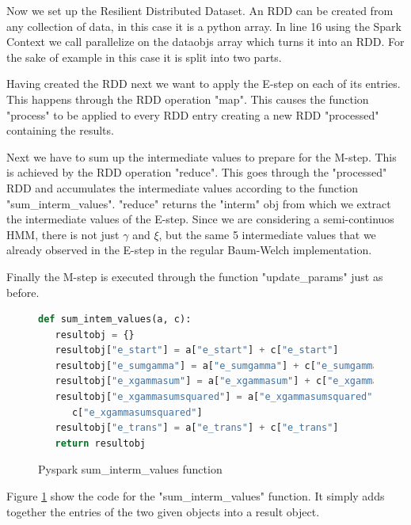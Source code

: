 Now we set up the Resilient Distributed Dataset. An RDD can be created from any collection of data, in this case it is a python array. In line 16 using the Spark Context we call parallelize on the dataobjs array which turns it into an RDD. For the sake of example in this case it is split into two parts. 

Having created the RDD next we want to apply the E-step on each of its entries. This happens through the RDD operation "map". This causes the function "process" to be applied to every RDD entry creating a new RDD "processed" containing the results. 

Next we have to sum up the intermediate values to prepare for the M-step. This is achieved by the RDD operation "reduce". This goes through the "processed" RDD and accumulates the intermediate values according to the function "sum\_interm\_values". "reduce" returns the "interm" obj from which we extract the intermediate values of the E-step. Since we are considering a semi-continuos HMM, there is not just $\gamma$ and $\xi$, but the same 5 intermediate values that we already observed in the E-step in the regular Baum-Welch implementation. 

Finally the M-step is executed through the function "update\_params" just as before. 

\begin{figure}
\begin{singlespace}
\begin{lstlisting}[language=Python]
def sum_intem_values(a, c):
   resultobj = {}
   resultobj["e_start"] = a["e_start"] + c["e_start"]
   resultobj["e_sumgamma"] = a["e_sumgamma"] + c["e_sumgamma"]
   resultobj["e_xgammasum"] = a["e_xgammasum"] + c["e_xgammasum"]
   resultobj["e_xgammasumsquared"] = a["e_xgammasumsquared"] + \
      c["e_xgammasumsquared"]
   resultobj["e_trans"] = a["e_trans"] + c["e_trans"]
   return resultobj
\end{lstlisting}
\end{singlespace}
\caption{Pyspark sum\_interm\_values function}    
\label{fig:pyspark-sum-listing}
\end{figure}

Figure \ref{fig:pyspark-sum-listing} show the code for the "sum\_interm\_values" function. It simply adds together the entries of the two given objects into a result object. 


